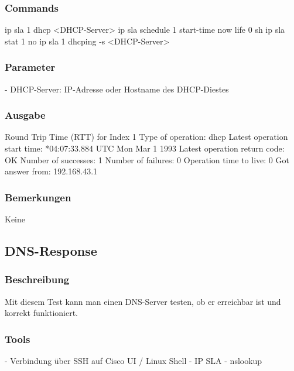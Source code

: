 \documentclass[a4,12pt]{scrartcl}
\begin{document}
\subsubsection{Commands}
ip sla 1\newline
dhcp <DHCP-Server>\newline
ip sla schedule 1 start-time now life 0\newline
sh ip sla stat 1\newline
no ip sla 1\newline
{}
dhcping -s <DHCP-Server>
\subsubsection{Parameter}
- DHCP-Server: IP-Adresse oder Hostname des DHCP-Diestes
\subsubsection{Ausgabe}
Round Trip Time (RTT) for Index 1\newline
Type of operation: dhcp\newline
Latest operation start time: *04:07:33.884 UTC Mon Mar 1 1993\newline
Latest operation return code: OK\newline
Number of successes: 1\newline
Number of failures: 0\newline
Operation time to live: 0\newline
{}
Got answer from: 192.168.43.1
\subsubsection{Bemerkungen}
Keine
\subsection{DNS-Response}
\subsubsection{Beschreibung}
Mit diesem Test kann man einen DNS-Server testen, ob er erreichbar ist und korrekt funktioniert.
\subsubsection{Tools}
- Verbindung über SSH auf Cisco UI / Linux Shell\newline
- IP SLA\newline
- nslookup\newline
\end{document}
